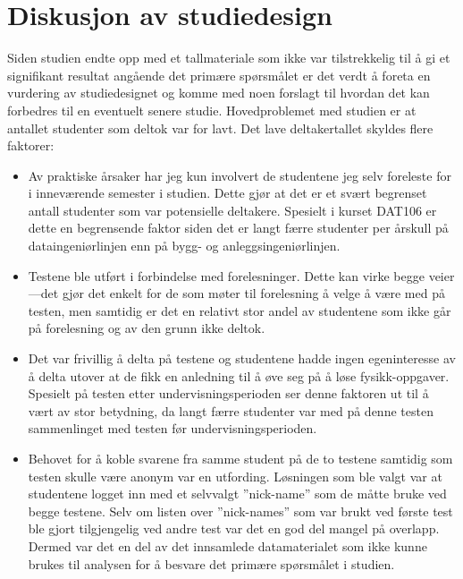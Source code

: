 \documentclass[a4paper,norsk,12pt]{report}
\begin{document}
\chapter{Diskusjon av studiedesign}
Siden studien endte opp med et tallmateriale som ikke var tilstrekkelig til å gi et signifikant resultat angående det primære spørsmålet er det verdt å foreta en vurdering av studiedesignet og komme med noen forslagt til hvordan det kan forbedres til en eventuelt senere studie. Hovedproblemet med studien er at antallet studenter som deltok var for lavt. Det lave deltakertallet skyldes flere faktorer:
\begin{itemize}
\item
Av praktiske årsaker har jeg kun involvert de studentene jeg selv foreleste for i inneværende semester i studien. Dette gjør at det er et svært begrenset antall studenter som var potensielle deltakere. Spesielt i kurset DAT106 er dette en begrensende faktor siden det er langt færre studenter per årskull på dataingeniørlinjen enn på bygg- og anleggsingeniørlinjen.
\item
Testene ble utført i forbindelse med forelesninger. Dette kan virke begge veier---det gjør det enkelt for de som møter til forelesning å velge å være med på testen, men samtidig er det en relativt stor andel av studentene som ikke går på forelesning og av den grunn ikke deltok.
\item
Det var frivillig å delta på testene og studentene hadde ingen egeninteresse av å delta utover at de fikk en anledning til å øve seg på å løse fysikk-oppgaver.  Spesielt på testen etter undervisningsperioden ser denne faktoren ut til å vært av stor betydning, da langt færre studenter var med på denne testen sammenlinget med testen før undervisningsperioden.
\item
Behovet for å koble svarene fra samme student på de to testene samtidig som testen skulle være anonym var en utfording. Løsningen som ble valgt var at studentene logget inn med et selvvalgt ''nick-name'' som de måtte bruke ved begge testene. Selv om listen over ''nick-names'' som var brukt ved første test ble gjort tilgjengelig ved andre test var det en god del mangel på overlapp. Dermed var det en del av det innsamlede datamaterialet som ikke kunne brukes til analysen for å besvare det primære spørsmålet i studien.
\end{itemize}
\end{document}
